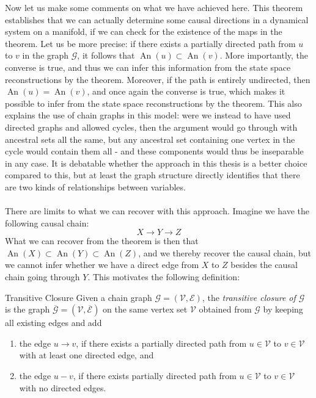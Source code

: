 \documentclass[11pt, a4paper]{memoir}
\theoremstyle{break}
\theoremstyle{break}
\theoremstyle{nonumberplain}
\DeclareMathOperator{\an}{An}
\begin{document}
Now let us make some comments on what we have achieved here. This theorem establishes that we can actually determine some causal directions in a dynamical system on a manifold, if we can check for the existence of the maps in the theorem. Let us be more precise: if there exists a partially directed path from $u$ to $v$ in the graph $\mathcal{G}$, it follows that $\an(u)\subset \an(v)$. More importantly, the converse is true, and thus we can infer this information from the state space reconstructions by the theorem. Moreover, if the path is entirely undirected, then $\an(u)=\an(v)$, and once again the converse is true, which makes it possible to infer from the state space reconstructions by the theorem. This also explains the use of chain graphs in this model: were we instead to have used directed graphs and allowed cycles, then the argument would go through with ancestral sets all the same, but any ancestral set containing one vertex in the cycle would contain them all - and these components would thus be inseparable in any case. It is debatable whether the approach in this thesis is a better choice compared to this, but at least the graph structure directly identifies that there are two kinds of relationships between variables.\\\\
There are limits to what we can recover with this approach. Imagine we have the following causal chain:
$$X\rightarrow Y\rightarrow Z$$
What we can recover from the theorem is then that $\an(X)\subset \an(Y)\subset \an(Z)$, and we thereby recover the causal chain, but we cannot infer whether we have a direct edge from $X$ to $Z$ besides the causal chain going through $Y$. This motivates the following definition:
\begin{mydefinition}{Transitive Closure}
Given a chain graph $\mathcal{G}=(\mathcal{V},\mathcal{E})$, the \emph{transitive  closure of $\mathcal{G}$} is the graph $\overline{\mathcal{G}}=(\mathcal{V},\overline{\mathcal{E}})$ on the same vertex set $\mathcal{V}$ obtained from $\mathcal{G}$ by keeping all existing edges and add
\begin{enumerate}[label=\roman*)]
	\item the edge $u\to v$, if there exists a partially directed path from $u\in \mathcal{V}$ to $v\in \mathcal{V}$ with at least one directed edge, and
	\item the edge $u-v$, if there exists  partially directed path from $u\in \mathcal{V}$ to $v\in \mathcal{V}$ with no directed edges.
\end{enumerate} 
\end{mydefinition}
\end{document}
